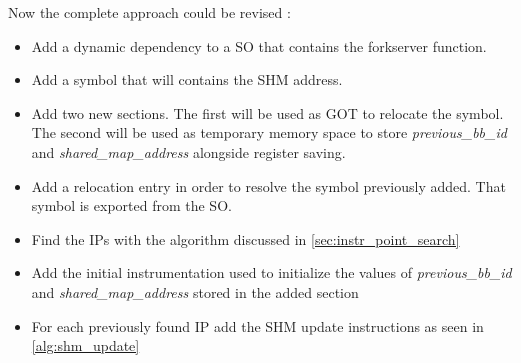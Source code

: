 Now the complete approach could be revised : 
\begin{itemize}
    \item Add a dynamic dependency to a \gls{SO} that contains the forkserver function.
    \item Add a symbol that will contains the \gls{SHM} address.
    \item Add two new sections. The first will be used as \gls{GOT} to relocate the symbol. The second will 
        be used as temporary memory space to store \textit{previous\_bb\_id} and \textit{shared\_map\_address} alongside register saving.
    \item Add a relocation entry in order to resolve the symbol previously added. That symbol is exported from the \gls{SO}.
    \item Find the \gls{IP}s with the algorithm discussed in \cref{sec:instr_point_search}
    \item Add the initial instrumentation used to initialize the values of 
        \textit{previous\_bb\_id} and \textit{shared\_map\_address} stored in the added section
    \item For each previously found \gls{IP} add the \gls{SHM} update instructions as seen in \cref{alg:shm_update}
\end{itemize}

